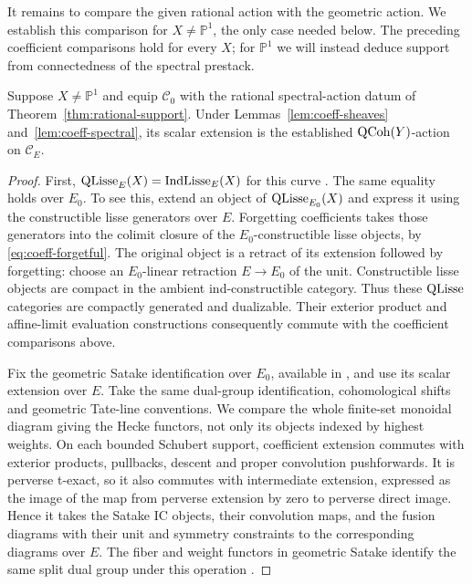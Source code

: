 It remains to compare the given rational action with the geometric
action. We establish this comparison for $X\ne\mathbb P^1$, the only
case needed below. The preceding coefficient comparisons hold for
every $X$; for $\mathbb P^1$ we will instead deduce support from
connectedness of the spectral prestack.

\begin{lemma}\label{lem:coeff-action}
Suppose $X\ne\mathbb P^1$ and equip $\mathcal C_0$ with the rational
spectral-action datum of Theorem~\ref{thm:rational-support}.
Under Lemmas~\ref{lem:coeff-sheaves} and~\ref{lem:coeff-spectral}, its
scalar extension is the established $\operatorname{QCoh}(Y)$-action on
$\mathcal C_E$.
\end{lemma}
\begin{proof}
First, $\operatorname{QLisse}_E(X)=\operatorname{IndLisse}_E(X)$ for this curve
\cite[\S1.3.3 and \S E.2.8]{AGKRRV}. The same equality holds over
$E_0$. To see this, extend an object of $\operatorname{QLisse}_{E_0}(X)$ and express
it using the constructible lisse generators over $E$. Forgetting
coefficients takes those generators into the colimit closure of the
$E_0$-constructible lisse objects, by
\eqref{eq:coeff-forgetful}. The original object is a retract of its
extension followed by forgetting: choose an $E_0$-linear retraction
$E\to E_0$ of the unit. Constructible lisse objects are compact in
the ambient ind-constructible category. Thus these $\operatorname{QLisse}$
categories are compactly generated and dualizable. Their exterior
product and affine-limit evaluation constructions consequently commute
with the coefficient comparisons above.

Fix the geometric Satake identification over $E_0$, available in
\cite[Theorem~14.1]{MirkovicVilonen}, and use its scalar extension
over $E$. Take the same dual-group identification, cohomological
shifts and geometric Tate-line conventions. We compare the whole
finite-set monoidal diagram giving the Hecke functors, not only its
objects indexed by highest weights. On each bounded Schubert support,
coefficient extension commutes with exterior products, pullbacks,
descent and proper convolution pushforwards. It is perverse t-exact,
so it also commutes with intermediate extension, expressed as the
image of the map from perverse extension by zero to perverse direct
image. Hence it takes the Satake IC objects, their convolution maps,
and the fusion diagrams with their unit and symmetry constraints to
the corresponding diagrams over $E$. The fiber and weight functors
in geometric Satake identify the same split dual group under this
operation \cite[\S\S4--6 and Theorem~14.1]{MirkovicVilonen}.


\end{proof}
